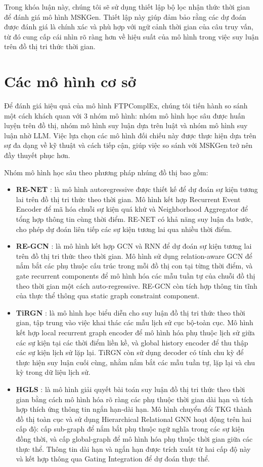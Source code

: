 Trong khóa luận này, chúng tôi sẽ sử dụng thiết lập bộ lọc nhận thức thời gian để đánh giá mô hình MSKGen. Thiết lập này giúp đảm bảo rằng các dự đoán được đánh giá là chính xác và phù hợp với ngữ cảnh thời gian của câu truy vấn, từ đó cung cấp cái nhìn rõ ràng hơn về hiệu suất của mô hình trong việc suy luận trên đồ thị tri thức thời gian.
\section{Các mô hình cơ sở}
Để đánh giá hiệu quả của mô hình FTPComplEx, chúng tôi tiến hành so sánh một cách khách quan với 3 nhóm mô hình: nhóm mô hình học sâu được huấn luyện trên đồ thị, nhóm mô hình suy luận dựa trên luật và nhóm mô hình suy luận nhờ LLM. Việc lựa chọn các mô hình đối chiếu này được thực hiện dựa trên sự đa dạng về kỹ thuật và cách tiếp cận, giúp việc so sánh với MSKGen trở nên đầy thuyết phục hơn. 

Nhóm mô hình học sâu theo phương pháp nhúng đồ thị bao gồm:
\begin{itemize}
    \item \textbf{RE-NET} \cite{ref_article12}: là mô hình autoregressive được thiết kế để dự đoán sự kiện tương lai trên đồ thị tri thức theo thời gian. Mô hình kết hợp Recurrent Event Encoder để mã hóa chuỗi sự kiện quá khứ và Neighborhood Aggregator để tổng hợp thông tin cùng thời điểm. RE-NET có khả năng suy luận đa bước, cho phép dự đoán liên tiếp các sự kiện tương lai qua nhiều thời điểm.
    \item \textbf{RE-GCN} \cite{ref_article13}: là mô hình kết hợp GCN và RNN để dự đoán sự kiện tương lai trên đồ thị tri thức theo thời gian. Mô hình sử dụng relation-aware GCN để nắm bắt các phụ thuộc cấu trúc trong mỗi đồ thị con tại từng thời điểm, và gate recurrent components để mô hình hóa các mẫu tuần tự của chuỗi đồ thị theo thời gian một cách auto-regressive. RE-GCN còn tích hợp thông tin tĩnh của thực thể thông qua static graph constraint component.
    \item \textbf{TiRGN} \cite{ref_article22}:  là mô hình học biểu diễn cho suy luận đồ thị tri thức theo thời gian, tập trung vào việc khai thác các mẫu lịch sử cục bộ-toàn cục. Mô hình kết hợp local recurrent graph encoder để mô hình hóa phụ thuộc lịch sử giữa các sự kiện tại các thời điểm liền kề, và global history encoder để thu thập các sự kiện lịch sử lặp lại. TiRGN còn sử dụng decoder có tính chu kỳ để thực hiện suy luận cuối cùng, nhằm nắm bắt các mẫu tuần tự, lặp lại và chu kỳ trong dữ liệu lịch sử.
    \item \textbf{HGLS} \cite{ref_article14}: là mô hình giải quyết bài toán suy luận đồ thị tri thức theo thời gian bằng cách mô hình hóa rõ ràng các phụ thuộc thời gian dài hạn và tích hợp thích ứng thông tin ngắn hạn-dài hạn. Mô hình chuyển đổi TKG thành đồ thị toàn cục và sử dụng Hierarchical Relational GNN hoạt động trên hai cấp độ: cấp sub-graph để nắm bắt phụ thuộc ngữ nghĩa trong các sự kiện đồng thời, và cấp global-graph để mô hình hóa phụ thuộc thời gian giữa các thực thể. Thông tin dài hạn và ngắn hạn được trích xuất từ hai cấp độ này và kết hợp thông qua Gating Integration để dự đoán thực thể.
\end{itemize}

